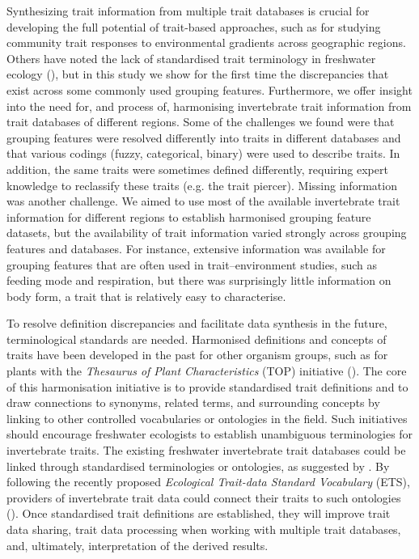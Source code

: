 \documentclass[12pt]{article}
\begin{document}
Synthesizing trait information from multiple trait databases is crucial for developing the full potential of trait-based approaches, such as for studying community trait responses to environmental gradients across geographic regions. Others have noted the lack of standardised trait terminology in freshwater ecology (\cite{baird_toward_2011, brink_traits-based_2011}), but in this study we show for the first time the discrepancies that exist across some commonly used grouping features. Furthermore, we offer insight into the need for, and process of, harmonising invertebrate trait information from trait databases of different regions. Some of the challenges we found were that grouping features were resolved differently into traits in different databases and that various codings (fuzzy, categorical, binary) were used to describe traits. In addition, the same traits were sometimes defined differently, requiring expert knowledge to reclassify these traits (e.g. the trait piercer). Missing information was another challenge. We aimed to use most of the available invertebrate trait information for different regions to establish harmonised grouping feature datasets, but the availability of trait information varied strongly across grouping features and databases. For instance, extensive information was available for grouping features that are often used in trait–environment studies, such as feeding mode and respiration, but there was surprisingly little information on body form, a trait that is relatively easy to characterise.

To resolve definition discrepancies and facilitate data synthesis in the future, terminological standards are needed. Harmonised definitions and concepts of traits have been developed in the past for other organism groups, such as for plants with the \textit{Thesaurus of Plant Characteristics} (TOP) initiative (\cite{garnier_towards_2017}). The core of this harmonisation initiative is to provide standardised trait definitions and to draw connections to synonyms, related terms, and surrounding concepts by linking to other controlled vocabularies or ontologies in the field. Such initiatives should encourage freshwater ecologists to establish unambiguous terminologies for invertebrate traits. The existing freshwater invertebrate trait databases could be linked through standardised terminologies or ontologies, as suggested by \citet{baird_toward_2011}. By following the recently proposed \textit{Ecological Trait-data Standard Vocabulary} (ETS), providers of invertebrate trait data could connect their traits to such ontologies (\cite{schneider_towards_2019}). Once standardised trait definitions are established, they will improve trait data sharing, trait data processing when working with multiple trait databases, and, ultimately, interpretation of the derived results. 
\end{document}
